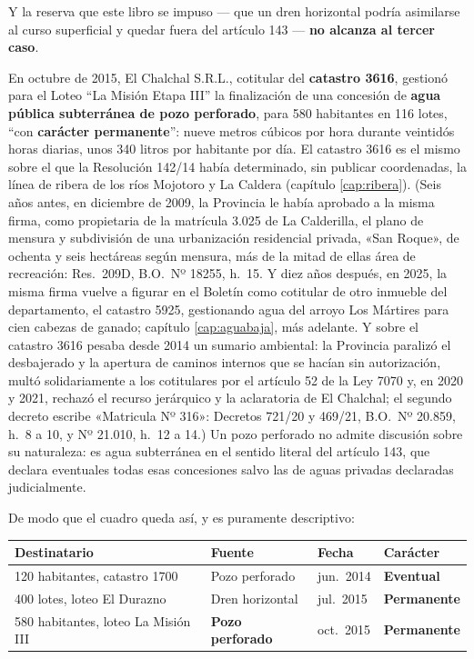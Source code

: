 \begin{cautela}
Y la reserva que este libro se impuso --- que un dren horizontal podría asimilarse al curso superficial y quedar fuera del artículo 143 --- \textbf{no alcanza al tercer caso}.

En octubre de 2015, El Chalchal S.R.L., cotitular del \textbf{catastro 3616}, gestionó para el Loteo ``La Misión Etapa III'' la finalización de una concesión de \textbf{agua pública subterránea de pozo perforado}, para 580 habitantes en 116 lotes, ``con \textbf{carácter permanente}'': nueve metros cúbicos por hora durante veintidós horas diarias, unos 340 litros por habitante por día. El catastro 3616 es el mismo sobre el que la Resolución 142/14 había determinado, sin publicar coordenadas, la línea de ribera de los ríos Mojotoro y La Caldera (capítulo \ref{cap:ribera}). (Seis años antes, en diciembre de 2009, la Provincia le había aprobado a la misma firma, como propietaria de la matrícula 3.025 de La Calderilla, el plano de mensura y subdivisión de una urbanización residencial privada, «San Roque», de ochenta y seis hectáreas según mensura, más de la mitad de ellas área de recreación: Res.\ 209D, B.O.\ Nº 18255, h.\ 15. Y diez años después, en 2025, la misma firma vuelve a figurar en el Boletín como cotitular de otro inmueble del departamento, el catastro 5925, gestionando agua del arroyo Los Mártires para cien cabezas de ganado; capítulo \ref{cap:aguabaja}, más adelante. Y sobre el catastro 3616 pesaba desde 2014 un sumario ambiental: la Provincia paralizó el desbajerado y la apertura de caminos internos que se hacían sin autorización, multó solidariamente a los cotitulares por el artículo 52 de la Ley 7070 y, en 2020 y 2021, rechazó el recurso jerárquico y la aclaratoria de El Chalchal; el segundo decreto escribe «Matricula Nº 316»: Decretos 721/20 y 469/21, B.O.\ Nº 20.859, h.\ 8 a 10, y Nº 21.010, h.\ 12 a 14.) Un pozo perforado no admite discusión sobre su naturaleza: es agua subterránea en el sentido literal del artículo 143, que declara eventuales todas esas concesiones salvo las de aguas privadas declaradas judicialmente.

De modo que el cuadro queda así, y es puramente descriptivo:

\begin{center}\small
\begin{tabular}{@{}p{3.7cm}p{2.5cm}p{2.4cm}p{2.9cm}@{}}
\toprule
\textbf{Destinatario} & \textbf{Fuente} & \textbf{Fecha} & \textbf{Carácter} \\
\midrule
120 habitantes, catastro 1700 & Pozo perforado & jun.\ 2014 & \textbf{Eventual} \\
400 lotes, loteo El Durazno & Dren horizontal & jul.\ 2015 & \textbf{Permanente} \\
580 habitantes, loteo La Misión III & \textbf{Pozo perforado} & oct.\ 2015 & \textbf{Permanente} \\
\bottomrule
\end{tabular}
\end{center}


\end{cautela}
